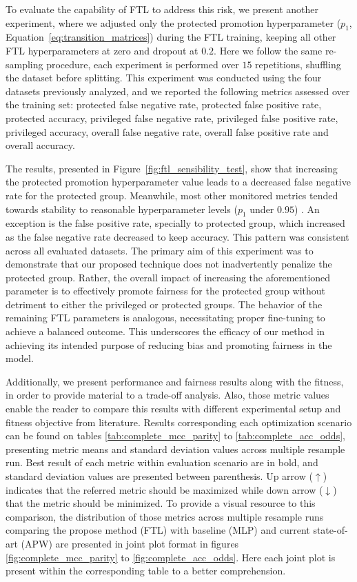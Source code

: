 To evaluate the capability of FTL to address this risk, we present another experiment, where we adjusted only the protected promotion hyperparameter ($p_1$,  Equation~\ref{eq:transition_matrices}) during the FTL training, keeping all other FTL hyperparameters at zero and dropout at $0.2$. Here we follow the same re-sampling procedure, each experiment is performed over $15$ repetitions, shuffling the dataset before splitting. This experiment was conducted using the four datasets previously analyzed, and we reported the following metrics assessed over the training set: protected false negative rate, protected false positive rate, protected accuracy, privileged false negative rate, privileged false positive rate, privileged accuracy, overall false negative rate, overall false positive rate and overall accuracy.

The results, presented in Figure~\ref{fig:ftl_sensibility_test}, show that increasing the protected promotion hyperparameter value leads to a decreased false negative rate for the protected group. Meanwhile, most other monitored metrics tended towards stability to reasonable hyperparameter levels ($p_1$ under $0.95$) . An exception is the false positive rate, specially to protected group, which increased as the false negative rate decreased to keep accuracy. This pattern was consistent across all evaluated datasets. The primary aim of this experiment was to demonstrate that our proposed technique does not inadvertently penalize the protected group. Rather, the overall impact of increasing the aforementioned parameter is to effectively promote fairness for the protected group without detriment to either the privileged or protected groups. The behavior of the remaining FTL parameters is analogous, necessitating proper fine-tuning to achieve a balanced outcome. This underscores the efficacy of our method in achieving its intended purpose of reducing bias and promoting fairness in the model.

Additionally, we present performance and fairness results along with the fitness, in order to provide material to a trade-off analysis. Also, those metric values enable the reader to compare this results with different experimental setup and fitness objective from literature. Results corresponding each optimization scenario can be found on tables \ref{tab:complete_mcc_parity} to \ref{tab:complete_acc_odds}, presenting metric means and standard deviation values across multiple resample run. Best result of each metric within evaluation scenario are in bold, and standard deviation values are presented between parenthesis. Up arrow ($\uparrow$) indicates that the referred metric should be maximized while down arrow ($\downarrow$) that the metric should be minimized. To provide a visual resource to this comparison, the distribution of those metrics across multiple resample runs comparing the propose method (FTL) with baseline (MLP) and current state-of-art (APW) are presented in joint plot format in figures \ref{fig:complete_mcc_parity} to \ref{fig:complete_acc_odds}. Here each joint plot is present within the corresponding table to a better comprehension.

